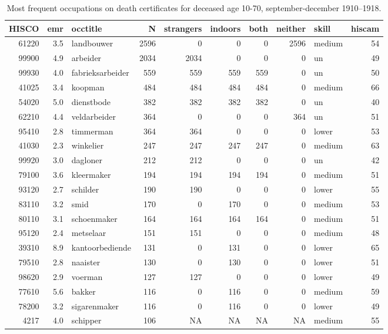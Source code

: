 \begin{table}

\caption{\label{tab:tab:topoccs_selected}Most frequent occupations on death certificates for deceased age 10-70, september-december 1910–1918.}
\centering
\begin{tabular}[t]{r|r|l|r|r|r|r|r|l|r}
\hline
HISCO & emr & occtitle & N & strangers & indoors & both & neither & skill & hiscam\\
\hline
61220 & 3.5 & landbouwer & 2596 & 0 & 0 & 0 & 2596 & medium & 54\\
\hline
99900 & 4.9 & arbeider & 2034 & 2034 & 0 & 0 & 0 & un & 49\\
\hline
99930 & 4.0 & fabrieksarbeider & 559 & 559 & 559 & 559 & 0 & un & 50\\
\hline
41025 & 3.4 & koopman & 484 & 484 & 484 & 484 & 0 & medium & 66\\
\hline
54020 & 5.0 & dienstbode & 382 & 382 & 382 & 382 & 0 & un & 40\\
\hline
62210 & 4.4 & veldarbeider & 364 & 0 & 0 & 0 & 364 & un & 51\\
\hline
95410 & 2.8 & timmerman & 364 & 364 & 0 & 0 & 0 & lower & 53\\
\hline
41030 & 2.3 & winkelier & 247 & 247 & 247 & 247 & 0 & medium & 63\\
\hline
99920 & 3.0 & dagloner & 212 & 212 & 0 & 0 & 0 & un & 42\\
\hline
79100 & 3.6 & kleermaker & 194 & 194 & 194 & 194 & 0 & medium & 51\\
\hline
93120 & 2.7 & schilder & 190 & 190 & 0 & 0 & 0 & lower & 55\\
\hline
83110 & 3.2 & smid & 170 & 0 & 170 & 0 & 0 & medium & 53\\
\hline
80110 & 3.1 & schoenmaker & 164 & 164 & 164 & 164 & 0 & medium & 51\\
\hline
95120 & 2.4 & metselaar & 151 & 151 & 0 & 0 & 0 & medium & 48\\
\hline
39310 & 8.9 & kantoorbediende & 131 & 0 & 131 & 0 & 0 & lower & 65\\
\hline
79510 & 2.8 & naaister & 130 & 0 & 130 & 0 & 0 & lower & 51\\
\hline
98620 & 2.9 & voerman & 127 & 127 & 0 & 0 & 0 & lower & 49\\
\hline
77610 & 5.6 & bakker & 116 & 0 & 116 & 0 & 0 & medium & 59\\
\hline
78200 & 3.2 & sigarenmaker & 116 & 0 & 116 & 0 & 0 & lower & 49\\
\hline
4217 & 4.0 & schipper & 106 & NA & NA & NA & NA & medium & 55\\

\end{tabular}
\end{table}
